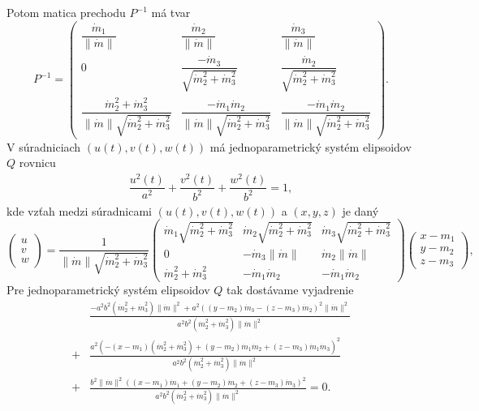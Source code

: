 Potom matica prechodu $P^{-1}$ má tvar
$$
P^{-1} = \left( \begin{matrix} \dfrac{\dot{m}_1}{\|\dot{m}\|} & \dfrac{\dot{m}_2}{\|\dot{m}\|} & \dfrac{\dot{m}_3}{\|\dot{m}\|} \\
0 & \dfrac{-\dot{m}_3}{\sqrt{\dot{m}_2^2 + \dot{m}_3^2}} & \dfrac{\dot{m}_2}{\sqrt{\dot{m}_2^2 + \dot{m}_3^2}} \\
\dfrac{\dot{m}_2^2 + \dot{m}_3^2}{\|\dot{m}\| \sqrt{\dot{m}_2^2 + \dot{m}_3^2}} & \dfrac{-\dot{m}_1 \dot{m}_2 }{\|\dot{m}\| \sqrt{\dot{m}_2^2 + \dot{m}_3^2}} &  \dfrac{-\dot{m}_1 \dot{m}_2}{ \|\dot{m}\| \sqrt{\dot{m}_2^2 + \dot{m}_3^2}} 
\end{matrix} \right).
$$
V súradniciach $(u(t),v(t),w(t))$ má jednoparametrický systém elipsoidov $Q$ rovnicu
\begin{align*}
\dfrac{u^2(t)}{a^2} + \dfrac{v^2(t)}{b^2} + \dfrac{w^2(t)}{b^2} = 1,
\end{align*}
kde vzťah medzi súradnicami $(u(t),v(t),w(t))$ a $(x,y,z)$ je daný
$$
\left(\begin{matrix}
u \\
v \\
w
\end{matrix}\right) = \frac{1}{ \| \dot{m}\| \sqrt{\dot{m}_2^2 + \dot{m}_3^2}}
\left( \begin{matrix} 
\dot{m}_1 \sqrt{\dot{m}_2^2 + \dot{m}_3^2} & \dot{m}_2 \sqrt{\dot{m}_2^2 + \dot{m}_3^2} & \dot{m}_3 \sqrt{\dot{m}_2^2 + \dot{m}_3^2} \\
0 & -\dot{m}_3 \| \dot{m}\| & \dot{m}_2 \| \dot{m}\| \\
\dot{m}_2^2 + \dot{m}_3^2 & -\dot{m}_1 \dot{m}_2 & -\dot{m}_1 \dot{m}_2 
\end{matrix} \right)
\left(\begin{matrix} x - m_1 \\ y - m_2 \\ z - m_3 \end{matrix}\right),
$$
Pre jednoparametrický systém elipsoidov $Q$ tak dostávame vyjadrenie
\begin{align*}
&\frac{- a^{2} b^{2} (\dot{m}_{2}^{2} + \dot{m}_{3}^{2}) \| \dot{m} \|^2 + a^{2} ((y - m_{2}) \dot{m}_{3} - (z - m_{3}) \dot{m}_{2})^{2} \| \dot{m} \|^2}{a^{2} b^{2} (\dot{m}_{2}^{2} + \dot{m}_{3}^{2}) \| \dot{m} \|^2} \\
+ &\frac{a^{2} (- (x - m_{1}) (\dot{m}_{2}^{2} + \dot{m}_{3}^{2}) + (y - m_{2}) \dot{m}_{1} \dot{m}_{2} + (z - m_{3}) \dot{m}_{1} \dot{m}_{3})^{2}}{a^{2} b^{2} (\dot{m}_{2}^{2} + \dot{m}_{3}^{2}) \| \dot{m} \|^2} \\
+ &\frac{b^{2} \| \dot{m} \|^2  ((x - m_{1}) \dot{m}_{1} + (y - m_{2}) \dot{m}_{2} + (z - m_{3}) \dot{m}_{3})^{2}}{a^{2} b^{2} (\dot{m}_{2}^{2} + \dot{m}_{3}^{2}) \| \dot{m} \|^2} = 0.
\end{align*}

